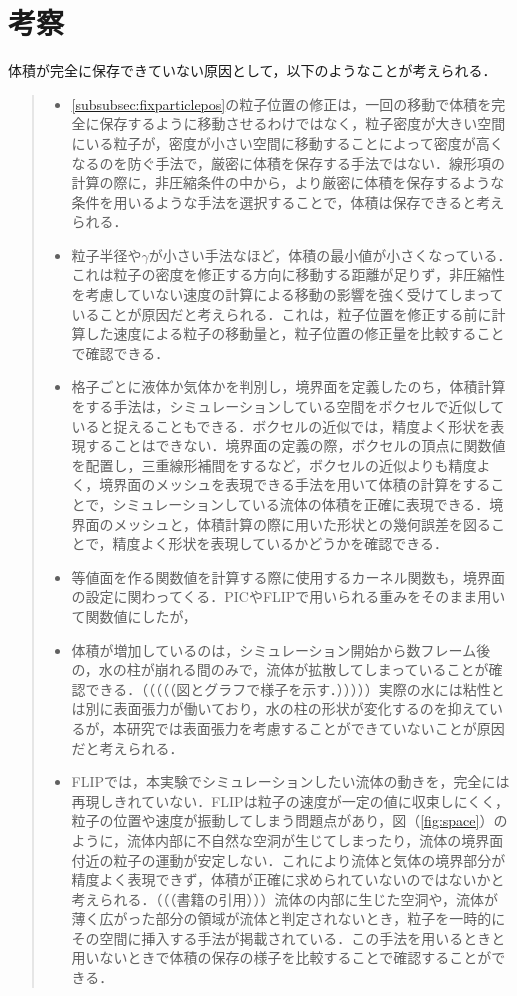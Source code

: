 \documentclass[a4j,12pt]{jreport}
\begin{document}
\section{考察} \label{sec:exp_consideration}
体積が完全に保存できていない原因として，以下のようなことが考えられる．
\begin{quote}
	\begin{itemize}
		\item \ref{subsubsec:fixparticlepos}の粒子位置の修正は，一回の移動で体積を完全に保存するように移動させるわけではなく，粒子密度が大きい空間にいる粒子が，密度が小さい空間に移動することによって密度が高くなるのを防ぐ手法で，厳密に体積を保存する手法ではない．線形項の計算の際に，非圧縮条件の中から，より厳密に体積を保存するような条件を用いるような手法を選択することで，体積は保存できると考えられる．
		\item 粒子半径や$\gamma$が小さい手法なほど，体積の最小値が小さくなっている．これは粒子の密度を修正する方向に移動する距離が足りず，非圧縮性を考慮していない速度の計算による移動の影響を強く受けてしまっていることが原因だと考えられる．これは，粒子位置を修正する前に計算した速度による粒子の移動量と，粒子位置の修正量を比較することで確認できる．
		\item 格子ごとに液体か気体かを判別し，境界面を定義したのち，体積計算をする手法は，シミュレーションしている空間をボクセルで近似していると捉えることもできる．ボクセルの近似では，精度よく形状を表現することはできない．境界面の定義の際，ボクセルの頂点に関数値を配置し，三重線形補間をするなど，ボクセルの近似よりも精度よく，境界面のメッシュを表現できる手法を用いて体積の計算をすることで，シミュレーションしている流体の体積を正確に表現できる．境界面のメッシュと，体積計算の際に用いた形状との幾何誤差を図ることで，精度よく形状を表現しているかどうかを確認できる．
		\item 等値面を作る関数値を計算する際に使用するカーネル関数も，境界面の設定に関わってくる．PICやFLIPで用いられる重みをそのまま用いて関数値にしたが，
		\item 体積が増加しているのは，シミュレーション開始から数フレーム後の，水の柱が崩れる間のみで，流体が拡散してしまっていることが確認できる．（（（（（図とグラフで様子を示す．）））））実際の水には粘性とは別に表面張力が働いており，水の柱の形状が変化するのを抑えているが，本研究では表面張力を考慮することができていないことが原因だと考えられる．
		\item FLIPでは，本実験でシミュレーションしたい流体の動きを，完全には再現しきれていない．FLIPは粒子の速度が一定の値に収束しにくく，粒子の位置や速度が振動してしまう問題点があり，図（\ref{fig:space}）のように，流体内部に不自然な空洞が生じてしまったり，流体の境界面付近の粒子の運動が安定しない．これにより流体と気体の境界部分が精度よく表現できず，体積が正確に求められていないのではないかと考えられる．（（（書籍の引用）））流体の内部に生じた空洞や，流体が薄く広がった部分の領域が流体と判定されないとき，粒子を一時的にその空間に挿入する手法が掲載されている．この手法を用いるときと用いないときで体積の保存の様子を比較することで確認することができる．
	\end{itemize}
\end{quote}
\end{document}
